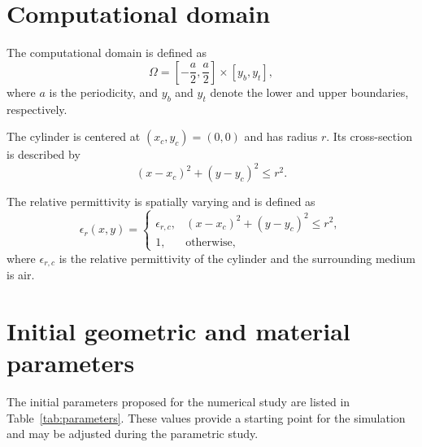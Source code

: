 \documentclass{article}
\begin{document}
\section{Computational domain}

The computational domain is defined as
\begin{equation}
    \Omega =
    \left[-\frac{a}{2},\frac{a}{2}\right]
    \times [y_b,y_t],
    \label{eq:domain}
\end{equation}
where $a$ is the periodicity, and $y_b$ and $y_t$ denote the lower and
upper boundaries, respectively.

The cylinder is centered at $(x_c,y_c)=(0,0)$ and has radius $r$. Its
cross-section is described by
\begin{equation}
    (x-x_c)^2+(y-y_c)^2 \leq r^2.
    \label{eq:cylinder}
\end{equation}

The relative permittivity is spatially varying and is defined as
\begin{equation}
    \epsilon_r(x,y)=
    \begin{cases}
        \epsilon_{r,c}, & (x-x_c)^2+(y-y_c)^2\leq r^2,\\
        1, & \text{otherwise},
    \end{cases}
    \label{eq:permittivity}
\end{equation}
where $\epsilon_{r,c}$ is the relative permittivity of the cylinder and
the surrounding medium is air.

\section{Initial geometric and material parameters}

The initial parameters proposed for the numerical study are listed in
Table~\ref{tab:parameters}. These values provide a starting point for
the simulation and may be adjusted during the parametric study.
\end{document}
